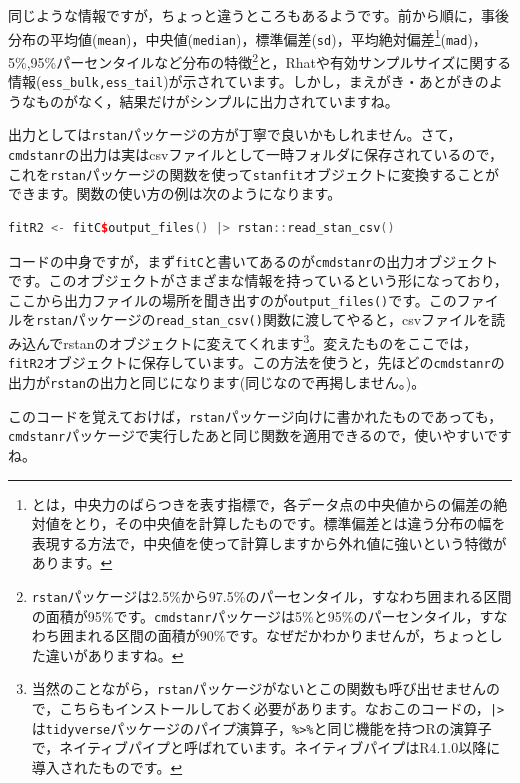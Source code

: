 \documentclass{ltjsbook}
\begin{document}
同じような情報ですが，ちょっと違うところもあるようです。前から順に，事後分布の平均値(\verb|mean|)，中央値(\verb|median|)，標準偏差(\verb|sd|)，平均絶対偏差\footnote{とは，中央力のばらつきを表す指標で，各データ点の中央値からの偏差の絶対値をとり，その中央値を計算したものです。標準偏差とは違う分布の幅を表現する方法で，中央値を使って計算しますから外れ値に強いという特徴があります。}(\verb|mad|)，5\%,95\%パーセンタイルなど分布の特徴\footnote{\verb|rstan|パッケージは2.5\%から97.5\%のパーセンタイル，すなわち囲まれる区間の面積が95\%です。\verb|cmdstanr|パッケージは5\%と95\%のパーセンタイル，すなわち囲まれる区間の面積が90\%です。なぜだかわかりませんが，ちょっとした違いがありますね。}と，Rhatや有効サンプルサイズに関する情報(\verb|ess_bulk,ess_tail|)が示されています。しかし，まえがき・あとがきのようなものがなく，結果だけがシンプルに出力されていますね。

出力としては\verb|rstan|パッケージの方が丁寧で良いかもしれません。さて，\verb|cmdstanr|の出力は実はcsvファイルとして一時フォルダに保存されているので，これを\verb|rstan|パッケージの関数を使って\verb|stanfit|オブジェクトに変換することができます。関数の使い方の例は次のようになります。

\begin{lstlisting}[language=C++,label={code:PRE_04},caption={cmdstanrの出力をrstanのオブジェクトに変える}]
fitR2 <- fitC$output_files() |> rstan::read_stan_csv() 
\end{lstlisting}

コードの中身ですが，まず\verb|fitC|と書いてあるのが\verb|cmdstanr|の出力オブジェクトです。このオブジェクトがさまざまな情報を持っているという形になっており，ここから出力ファイルの場所を聞き出すのが\verb|output_files()|です。このファイルを\verb|rstan|パッケージの\verb|read_stan_csv()|関数に渡してやると，csvファイルを読み込んでrstanのオブジェクトに変えてくれます\footnote{当然のことながら，\verb|rstan|パッケージがないとこの関数も呼び出せませんので，こちらもインストールしておく必要があります。なおこのコードの，\texttt{|>}は\verb|tidyverse|パッケージのパイプ演算子，\verb|%>%|と同じ機能を持つRの演算子で，ネイティブパイプと呼ばれています。ネイティブパイプはR4.1.0以降に導入されたものです。}。変えたものをここでは，\verb|fitR2|オブジェクトに保存しています。この方法を使うと，先ほどの\verb|cmdstanr|の出力が\verb|rstan|の出力と同じになります(同じなので再掲しません。)。

このコードを覚えておけば，\verb|rstan|パッケージ向けに書かれたものであっても，\verb|cmdstanr|パッケージで実行したあと同じ関数を適用できるので，使いやすいですね。
\end{document}
